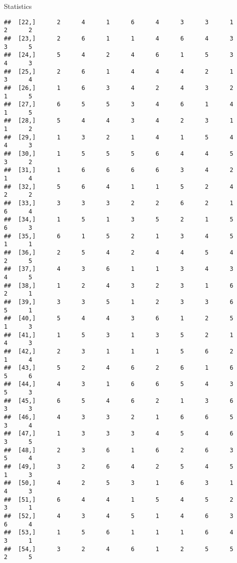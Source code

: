 \documentclass[
  ignorenonframetext,
]{beamer}
\begin{document}
\begin{frame}[fragile]{Statistics}
\begin{verbatim}
##  [22,]      2      4      1      6      4      3      3      1      2      2
##  [23,]      2      6      1      1      4      6      4      3      3      5
##  [24,]      5      4      2      4      6      1      5      3      4      3
##  [25,]      2      6      1      4      4      4      2      1      3      4
##  [26,]      1      6      3      4      2      4      3      2      1      5
##  [27,]      6      5      5      3      4      6      1      4      1      5
##  [28,]      5      4      4      3      4      2      3      1      1      2
##  [29,]      1      3      2      1      4      1      5      4      4      3
##  [30,]      1      5      5      5      6      4      4      5      3      2
##  [31,]      1      6      6      6      6      3      4      2      1      4
##  [32,]      5      6      4      1      1      5      2      4      2      2
##  [33,]      3      3      3      2      2      6      2      1      6      4
##  [34,]      1      5      1      3      5      2      1      5      6      3
##  [35,]      6      1      5      2      1      3      4      5      1      1
##  [36,]      2      5      4      2      4      4      5      4      2      5
##  [37,]      4      3      6      1      1      3      4      3      4      5
##  [38,]      1      2      4      3      2      3      1      6      2      1
##  [39,]      3      3      5      1      2      3      3      6      5      1
##  [40,]      5      4      4      3      6      1      2      5      1      3
##  [41,]      1      5      3      1      3      5      2      1      4      3
##  [42,]      2      3      1      1      1      5      6      2      1      4
##  [43,]      5      2      4      6      2      6      1      6      5      6
##  [44,]      4      3      1      6      6      5      4      3      5      3
##  [45,]      6      5      4      6      2      1      3      6      3      3
##  [46,]      4      3      3      2      1      6      6      5      3      4
##  [47,]      1      3      3      3      4      5      4      6      3      5
##  [48,]      2      3      6      1      6      2      6      3      5      4
##  [49,]      3      2      6      4      2      5      4      5      1      3
##  [50,]      4      2      5      3      1      6      3      1      4      3
##  [51,]      6      4      4      1      5      4      5      2      3      1
##  [52,]      4      3      4      5      1      4      6      3      6      4
##  [53,]      1      5      6      1      1      1      6      4      3      1
##  [54,]      3      2      4      6      1      2      5      5      2      5

\end{verbatim}
\end{frame}
\end{document}
